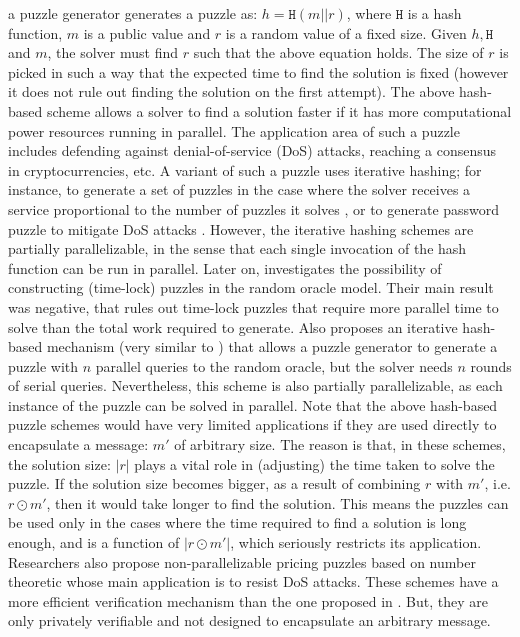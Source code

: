 a puzzle generator  generates a puzzle as: $h= \mathtt{H}(m||r)$, where $\mathtt{H}$ is a hash function, $m$ is a public value and $r$ is a random value of a fixed size. Given $h, \mathtt{H}$ and $m$, the solver must find $r$ such that the above equation holds. The size of $r$ is picked in such a way that the expected time to find the solution is fixed (however it does not rule out finding the solution on the first attempt). The above hash-based scheme allows a solver to find a solution faster if it has more computational power resources  running in parallel. The application area of such a puzzle includes  defending against denial-of-service (DoS)  attacks, reaching a consensus in cryptocurrencies, etc. A  variant  of such a puzzle uses iterative hashing; for instance, to generate a set of puzzles  in the case where the solver receives a service proportional to the number of puzzles it solves \cite{groza2006chained},  or to generate password puzzle to mitigate DoS attacks \cite{Ma05}. However, the iterative hashing schemes are partially parallelizable, in the sense that each single invocation of the hash function can be run in parallel. Later on,  \cite{MahmoodyMV11} investigates the possibility of constructing (time-lock) puzzles in the random oracle model.  Their main result was negative, that rules out time-lock puzzles that require more parallel time to solve than the total work required to generate.  Also \cite{MahmoodyMV11} proposes an iterative hash-based mechanism (very similar to \cite{Ma05}) that allows a puzzle generator to generate a puzzle with $n$ parallel queries to the random oracle, but the solver needs $n$ rounds of serial queries. Nevertheless, this scheme is also partially parallelizable, as each instance of the puzzle can be solved in parallel. Note that the above hash-based puzzle schemes would have very limited applications if they are used directly to  encapsulate a message: $m'$ of arbitrary size. The reason is that, in these schemes,  the solution  size: $|r|$ plays a vital role in (adjusting) the  time taken to solve the puzzle. If the solution size becomes bigger, as a result of combining $r$ with $m'$, i.e. $r \odot m'$, then it would take longer to find the solution. This means  the puzzles can be used only in the cases where  the time required to find a solution is long enough, and is a function of $|r \odot m'|$, which seriously restricts its application. Researchers also propose non-parallelizable pricing puzzles based on number theoretic \cite{WatersJHF04,KuppusamyRSBN12,KarameC10} whose main application is to resist DoS attacks. These schemes  have a more efficient verification mechanism than the one proposed in \cite{Rivest:1996:TPT:888615}. But, they are only privately verifiable and not designed to encapsulate an arbitrary message. 





